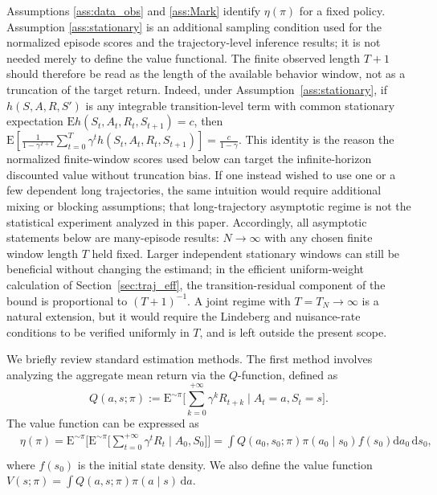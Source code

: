 \documentclass[12pt]{article}
\theoremstyle{remark}\newtheorem{remark}[theorem]{Remark}\theoremstyle{plain}
\newcommand{\E}{\mathrm{E}}
\begin{document}
Assumptions \ref{ass:data_obs} and \ref{ass:Mark} identify
$\eta(\pi)$ for a fixed policy.  Assumption \ref{ass:stationary} is an
additional sampling condition used for the normalized episode scores
and the trajectory-level inference results; it is not needed merely
to define the value functional.
The finite observed length $T+1$ should therefore be read as the length
of the available behavior window, not as a truncation of the target return.
Indeed, under Assumption~\ref{ass:stationary}, if $h(S,A,R,S')$ is any
integrable transition-level term with common stationary expectation
$\E h(S_t,A_t,R_t,S_{t+1})=c$, then
$
    \E\!\left[
    \frac{1}{1-\gamma^{T+1}}\sum_{t=0}^{T}\gamma^t
    h(S_t,A_t,R_t,S_{t+1})
    \right]
    =
    \frac{c}{1-\gamma}.
$
This identity is the reason the normalized finite-window scores used below
can target the infinite-horizon discounted value without truncation bias.
If one instead wished to use one or a few dependent long trajectories, the
same intuition would require additional mixing or blocking assumptions; that
long-trajectory asymptotic regime is not the statistical experiment analyzed
in this paper.  Accordingly, all asymptotic statements below are
many-episode results: $N\to\infty$ with any chosen finite window length
$T$ held fixed.  Larger independent stationary windows can still be
beneficial without changing the estimand; in the efficient
uniform-weight calculation of Section~\ref{sec:traj_eff}, the
transition-residual component of the bound is proportional to
$(T+1)^{-1}$.  A joint regime with $T=T_N\to\infty$ is a natural
extension, but it would require the Lindeberg and nuisance-rate
conditions to be verified uniformly in $T$, and is left outside the
present scope.

We briefly review standard estimation methods. 
The first method involves analyzing the aggregate mean return via the $Q$-function, defined as
\begin{equation}\label{eq:Q_fun}
    Q(a, s; \pi) := \E^{\sim \pi} \bigg[ \sum_{k = 0}^{+ \infty} \gamma^k R_{t + k} \mid A_t = a, S_t = s\bigg].
\end{equation}
The value function can be expressed as
\[
    \begin{aligned}
        & \eta(\pi) = \E^{\sim \pi} \Bigg[ \E^{\sim \pi} \bigg[ \sum_{t = 0}^{+\infty} \gamma^t R_t \mid A_0, S_0 \bigg] \Bigg] = \int Q(a_0, s_0 ; \pi) \pi(a_0 \mid s_0) f(s_0) \mathrm{d} a_0 \, \mathrm{d} s_0, \\
    \end{aligned}
\]
where $f(s_0)$ is the initial state density. We also define the value function $V(s; \pi) =  \int Q(a, s; \pi) \pi(a \mid s) \, \mathrm{d} a$.
\end{document}

